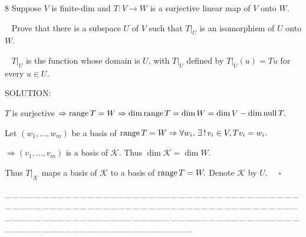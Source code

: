 \documentclass[a4paper, 11pt, UTF8]{article}
\def\range{\textup{range}\,}
\def\null{\textup{null\,}}
\begin{document}
\begin{large}
{\timesbf\Large 8} {\timessl\Large 
Suppose $V$ is finite-dim and $T: V\rightarrow W$ is a surjective linear map of $V$ onto $W$.}\par\,\,\,
{\timessl\Large Prove that there is a subspace $U$ of $V$ such that $T|_U$ is an isomorphism of $U$ onto $W$.}\par\,\,\,
{\timessl\small
$T|_U$ is the function whose domain is $U$, with $T|_U$ defined by $T|_U (u) = Tu$ for every $u\in U$.
}\par
{\timesbf S\footnotesize{OLUTION:}}\par\quad
$T$ is surjective $\Rightarrow\range T=W\Rightarrow\dim\range T=\dim W=\dim V-\dim\null T.$\par\quad
Let $(w_1,\dots,w_m)$ be a basis of $\range T=W\Rightarrow\forall w_i,\,\exists\,!\,v_i\in V,Tv_i=w_i.$\par\quad
$\Rightarrow(v_1,\dots,v_m)$ is a basis of $\mathcal{K}$. Thus $\dim\mathcal{K}=\dim W$.\par\quad
Thus $T|_\mathcal{K}$ maps a basis of $\mathcal{K}$ to a basis of $\range T=W.$ Denote $\mathcal{K}$ by $U$. $\quad\square$\par
{\tiny \_\,\_\,\_\,\_\,\_\,\_\,\_\,\_\,\_\,\_\,\_\,\_\,\_\,\_\,\_\,\_\,\_\,\_\,\_\,\_\,\_\,\_\,\_\,\_\,\_\,\_\,\_\,\_\,\_\,\_\,\_\,\_\,\_\,\_\,\_\,\_\,\_\,\_\,\_\,\_\,\_\,\_\,\_\,\_\,\_\,\_\,\_\,\_\,\_\,\_\,\_\,\_\,\_\,\_\,\_\,\_\,\_\,\_\,\_\,\_\,\_\,\_\,\_\,\_\,\_\,\_\,\_\,\_\,\_\,\_\,\_\_\,\_\,\_\,\_\,\_\,\_\,\_\,\_\,\_\,\_\,\_\,\_\,\_\,\_\,\_\,\_\,\_\,\_\,\_\,\_\,\_\,\_\,\_\,\_\,\_\,\_\,\_\,\_\,\_\,\_\,\_\,\_\,\_\,\_\,\_\,\_\,\_\,\_\,\_\,\_\,\_\,\_\,\_\,\_\,\_\,\_\,\_\,\_\,\_\,\_\,\_\,\_\,\_\,\_\,\_\,\_\,\_\,\_\,\_\,\_\,\_\,\_\,\_\,\_\,\_\,\_\,\_\,\_\,\_\,\_\,\_}\par


\end{large}
\end{document}
